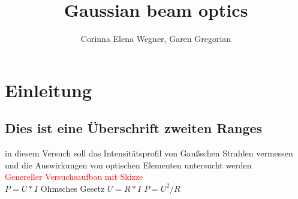 \documentclass{article}
\begin{document}
 

\title{Gaussian beam optics}
\author{Corinna Elena Wegner, Garen Gregorian}
\newpage
\tableofcontents
\newpage

\section{Einleitung} %
\subsection{Dies ist eine Überschrift zweiten Ranges}
in diesem Versuch soll das Intensitätsprofil von Gaußschen Strahlen vermessen und die Auswirkungen von optischen Elementen untersucht werden\\

\textcolor{red}{Genereller Versuchsaufbau mit Skizze}\\


$ P = U*I $
Ohmsches Gesetz
$ U= R* I$
$P = U^2/R$
\end{document}
